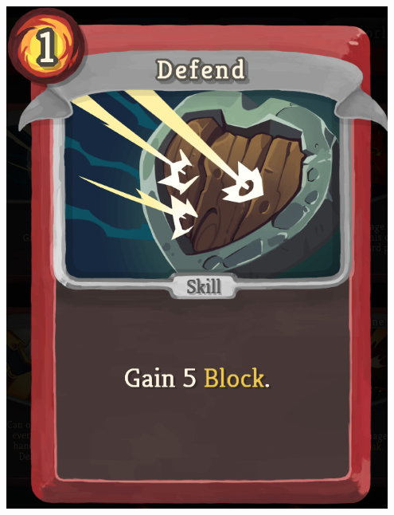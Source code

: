 \begin{center}
    \captionsetup{type=figure}
    \begin{minipage}{.25\textwidth}
        \centering
        \includegraphics[width=0.95\textwidth]{img/Slay-the-Spire-Defend.png}
        \label{fig:sts-defend}
    \end{minipage}%
    \begin{minipage}{.25\textwidth}
        \centering
        \captionsetup{justification=centering}

\end{minipage}
\end{center}
